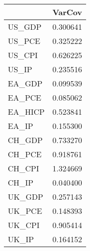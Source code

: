 \begin{tabular}{lr}
\toprule
{} &    VarCov \\
\midrule
US\_GDP  &  0.300641 \\
US\_PCE  &  0.325222 \\
US\_CPI  &  0.626225 \\
US\_IP   &  0.235516 \\
EA\_GDP  &  0.099539 \\
EA\_PCE  &  0.085062 \\
EA\_HICP &  0.523841 \\
EA\_IP   &  0.155300 \\
CH\_GDP  &  0.733270 \\
CH\_PCE  &  0.918761 \\
CH\_CPI  &  1.324669 \\
CH\_IP   &  0.040400 \\
UK\_GDP  &  0.257143 \\
UK\_PCE  &  0.148393 \\
UK\_CPI  &  0.905414 \\
UK\_IP   &  0.164152 \\
\bottomrule
\end{tabular}
